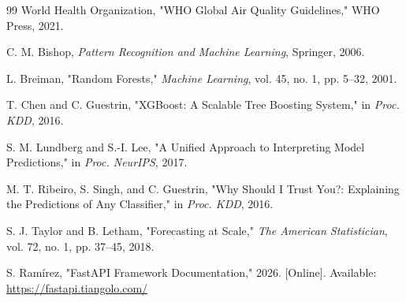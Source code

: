 \documentclass[12pt,a4paper]{article}
\begin{document}
\begin{thebibliography}{99}
World Health Organization, "WHO Global Air Quality Guidelines," WHO Press, 2021.

C. M. Bishop, \textit{Pattern Recognition and Machine Learning}, Springer, 2006.

L. Breiman, "Random Forests," \textit{Machine Learning}, vol. 45, no. 1, pp. 5--32, 2001.

T. Chen and C. Guestrin, "XGBoost: A Scalable Tree Boosting System," in \textit{Proc. KDD}, 2016.

S. M. Lundberg and S.-I. Lee, "A Unified Approach to Interpreting Model Predictions," in \textit{Proc. NeurIPS}, 2017.

M. T. Ribeiro, S. Singh, and C. Guestrin, "Why Should I Trust You?: Explaining the Predictions of Any Classifier," in \textit{Proc. KDD}, 2016.

S. J. Taylor and B. Letham, "Forecasting at Scale," \textit{The American Statistician}, vol. 72, no. 1, pp. 37--45, 2018.

S. Ramírez, "FastAPI Framework Documentation," 2026. [Online]. Available: \url{https://fastapi.tiangolo.com/}
\end{thebibliography}
\end{document}
